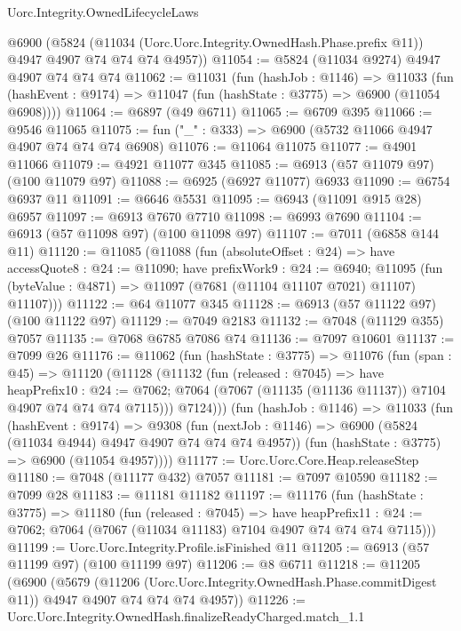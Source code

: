 \begin{lexlean}{Uorc.Integrity.OwnedLifecycleLaws}
\begin{coremodule}
    @6900
      (@5824
        (@11034 (Uorc.Uorc.Integrity.OwnedHash.Phase.prefix @11))
        @4947
        @4907
        @74
        @74
        @74
        @4957))
@11054 := @5824 (@11034 @9274) @4947 @4907 @74 @74 @74
@11062 := @11031
    (fun (hashJob : @1146) =>
    @11033 (fun (hashEvent : @9174) => @11047 (fun (hashState : @3775) => @6900 (@11054 @6908))))
@11064 := @6897 (@49 @6711)
@11065 := @6709 @395
@11066 := @9546 @11065
@11075 := fun ("_" : @333) => @6900 (@5732 @11066 @4947 @4907 @74 @74 @74 @6908)
@11076 := @11064 @11075
@11077 := @4901 @11066
@11079 := @4921 @11077 @345
@11085 := @6913 (@57 @11079 @97) (@100 @11079 @97)
@11088 := @6925 (@6927 @11077) @6933
@11090 := @6754 @6937 @11
@11091 := @6646 @5531
@11095 := @6943 (@11091 @915 @28) @6957
@11097 := @6913 @7670 @7710
@11098 := @6993 @7690
@11104 := @6913 (@57 @11098 @97) (@100 @11098 @97)
@11107 := @7011 (@6858 @144 @11)
@11120 := @11085
    (@11088
      (fun (absoluteOffset : @24) =>
      have accessQuote8 : @24 := @11090;
      have prefixWork9 : @24 := @6940;
      @11095 (fun (byteValue : @4871) => @11097 (@7681 (@11104 @11107 @7021) @11107) @11107)))
@11122 := @64 @11077 @345
@11128 := @6913 (@57 @11122 @97) (@100 @11122 @97)
@11129 := @7049 @2183
@11132 := @7048 (@11129 @355) @7057
@11135 := @7068 @6785 @7086 @74
@11136 := @7097 @10601
@11137 := @7099 @26
@11176 := @11062
    (fun (hashState : @3775) =>
    @11076
      (fun (span : @45) =>
      @11120
        (@11128
          (@11132
            (fun (released : @7045) =>
            have heapPrefix10 : @24 := @7062;
            @7064 (@7067 (@11135 (@11136 @11137)) @7104 @4907 @74 @74 @74 @7115)))
          @7124)))
    (fun (hashJob : @1146) =>
    @11033
      (fun (hashEvent : @9174) =>
      @9308
        (fun (nextJob : @1146) => @6900 (@5824 (@11034 @4944) @4947 @4907 @74 @74 @74 @4957))
        (fun (hashState : @3775) => @6900 (@11054 @4957))))
@11177 := Uorc.Uorc.Core.Heap.releaseStep
@11180 := @7048 (@11177 @432) @7057
@11181 := @7097 @10590
@11182 := @7099 @28
@11183 := @11181 @11182
@11197 := @11176
    (fun (hashState : @3775) =>
    @11180
      (fun (released : @7045) =>
      have heapPrefix11 : @24 := @7062;
      @7064 (@7067 (@11034 @11183) @7104 @4907 @74 @74 @74 @7115)))
@11199 := Uorc.Uorc.Integrity.Profile.isFinished @11
@11205 := @6913 (@57 @11199 @97) (@100 @11199 @97)
@11206 := @8 @6711
@11218 := @11205
    (@6900
      (@5679
        (@11206 (Uorc.Uorc.Integrity.OwnedHash.Phase.commitDigest @11))
        @4947
        @4907
        @74
        @74
        @74
        @4957))
@11226 := Uorc.Uorc.Integrity.OwnedHash.finalizeReadyCharged.match_1.{1}

\end{coremodule}
\end{lexlean}

